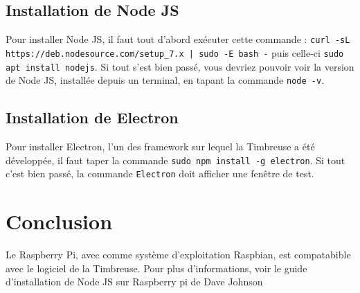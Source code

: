 \documentclass[10pt,a4paper,onecolumn]{article}
\begin{document}
\subsection{Installation de Node JS}
Pour installer Node JS, il faut tout d'abord exécuter cette commande : \texttt{curl -sL https://deb.nodesource.com/setup\_7.x | sudo -E bash -} puis celle-ci
\texttt{sudo apt install nodejs}. Si tout s'est bien passé, vous devriez pouvoir voir la version de Node JS, installée depuis un terminal, en tapant la commande \texttt{node -v}.

\subsection{Installation de Electron}
Pour installer Electron, l'un des framework sur lequel la Timbreuse a été développée, il faut taper la commande \texttt{sudo npm install -g electron}.
Si tout c'est bien passé, la commande \texttt{Electron} doit afficher une fenêtre de test.

\section{Conclusion}
Le Raspberry Pi, avec comme système d'exploitation Raspbian,
est compatabible avec le logiciel de la Timbreuse. Pour plus d'informations, voir le guide d'installation de Node JS sur Raspberry pi de Dave Johnson \cite{thisdavej}

\printbibliography
\end{document}
